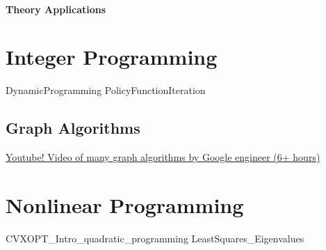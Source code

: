 \documentclass[letter,12pt]{book}
\renewcommand{\0}{\mathbf{0}}
\begin{document}
\subsection{Theory Applications} 


%

\part{Integer Programming}
\label{part:IntegerProgramming}













%



%


{DynamicProgramming}
{PolicyFunctionIteration}

\chapter{Graph Algorithms}
\href{https://www.youtube.com/watch?v=09_LlHjoEiY}{Youtube!  Video of many graph algorithms by Google engineer (6+ hours)}





\part{Nonlinear Programming}



{CVXOPT_Intro_quadratic_programming}
{LeastSquares_Eigenvalues}
\end{document}
